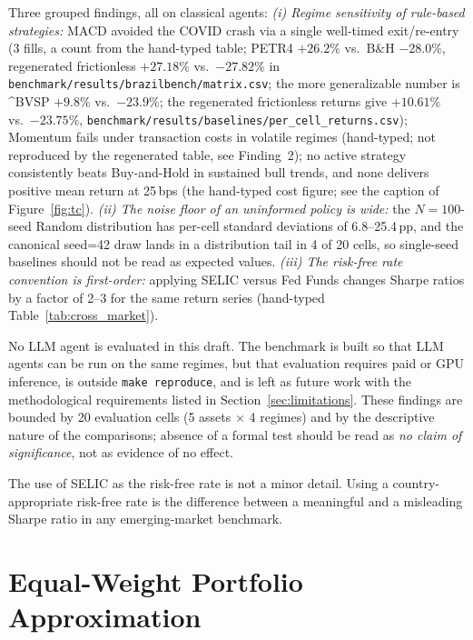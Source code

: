 \documentclass{article}
\begin{document}
Three grouped findings, all on classical agents: \textit{(i) Regime
sensitivity of rule-based strategies:} MACD avoided the COVID crash
via a single well-timed exit/re-entry (3 fills, a count from the hand-typed table; PETR4 $+26.2\%$ vs.\
B\&H $-28.0\%$, regenerated frictionless $+27.18\%$ vs.\ $-27.82\%$ in \texttt{benchmark/results/brazilbench/matrix.csv}; the more generalizable number is \^{}BVSP $+9.8\%$
vs.\ $-23.9\%$; the regenerated frictionless returns give $+10.61\%$ vs.\ $-23.75\%$, \texttt{benchmark/results/baselines/per\_cell\_returns.csv}); Momentum fails under transaction costs in volatile
regimes (hand-typed; not reproduced by the regenerated table, see Finding~2); no active strategy consistently beats Buy-and-Hold in
sustained bull trends, and none delivers positive mean return at
25\,bps (the hand-typed cost figure; see the caption of Figure~\ref{fig:tc}). \textit{(ii) The noise floor of an uninformed policy is
wide:} the $N{=}100$-seed Random distribution has per-cell standard
deviations of 6.8--25.4\,pp, and the canonical seed=42 draw
lands in a distribution tail in 4 of 20 cells, so single-seed
baselines should not be read as expected values. \textit{(iii) The
risk-free rate convention is first-order:} applying SELIC versus Fed
Funds changes Sharpe ratios by a factor of 2--3 for the same return
series (hand-typed Table~\ref{tab:cross_market}).

No LLM agent is evaluated in this draft. The benchmark is built so
that LLM agents can be run on the same regimes, but that evaluation
requires paid or GPU inference, is outside \texttt{make reproduce},
and is left as future work with the methodological requirements
listed in Section~\ref{sec:limitations}. These findings are bounded
by 20 evaluation cells (5 assets $\times$ 4 regimes) and by the
descriptive nature of the comparisons; absence of a formal test
should be read as \emph{no claim of significance}, not as evidence
of no effect.

The use of SELIC as the risk-free rate is not a minor detail. Using a
country-appropriate risk-free rate is the difference between a meaningful
and a misleading Sharpe ratio in any emerging-market benchmark.

\appendix
\section{Equal-Weight Portfolio Approximation}
\label{app:portfolio}
\end{document}
